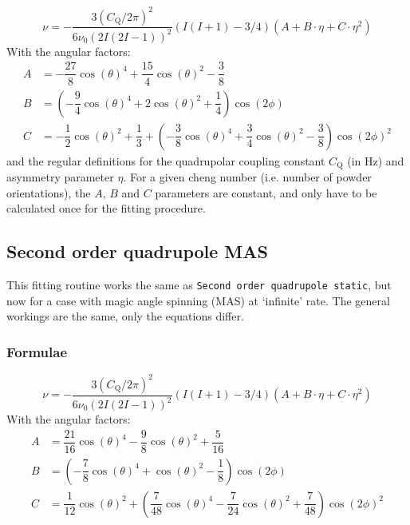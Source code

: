 \documentclass[11pt,a4paper]{article}
\begin{document}
\begin{equation}
\nu = -\dfrac{3{(C_\text{Q}/2\pi)}^2}{6\nu_0(2I(2I-1))^2}(I(I+1)-3/4)(A+B\cdot\eta+C\cdot\eta^2)
\end{equation}
With the angular factors:
\begin{align}
A &= -\dfrac{27}{8}\cos(\theta)^4+\dfrac{15}{4}\cos(\theta)^2-\dfrac{3}{8} \\
B &= \left(-\dfrac{9}{4}\cos(\theta)^4+2\cos(\theta)^2+\dfrac{1}{4}\right)\cos(2\phi) \\
C &=-\dfrac{1}{2}\cos(\theta)^2+\dfrac{1}{3}+\left(-\dfrac{3}{8}\cos(\theta)^4+\dfrac{3}{4}\cos(\theta)^2-\dfrac{3}{8}\right)\cos(2\phi)^2
\end{align}
and the regular definitions for the quadrupolar coupling constant $C_\text{Q}$ (in Hz) and asymmetry parameter $\eta$. For a given cheng number (i.e. number of powder orientations), the $A$, $B$ and $C$ parameters are constant, and only have to be calculated once for the fitting procedure.



\subsection{Second order quadrupole MAS}
This fitting routine works the same as \texttt{Second order quadrupole static}, but now for a case with magic angle spinning (MAS) at `infinite' rate. The general workings are the same, only the equations differ.

\subsubsection*{Formulae}
\begin{equation}
\nu = -\dfrac{3{(C_\text{Q}/2\pi)}^2}{6\nu_0(2I(2I-1))^2}(I(I+1)-3/4)(A+B\cdot\eta+C\cdot\eta^2)
\end{equation}
With the angular factors:
\begin{align}
A &=  \dfrac{21}{16} \cos(\theta)^4 - \dfrac{9}{8} \cos(\theta)^2 + \dfrac{5}{16}\\
B &=  \left(-\dfrac{7}{8} \cos(\theta)^4 + \cos(\theta)^2 - \dfrac{1}{8}\right) \cos(2 \phi)\\
C &=  \dfrac{1}{12} \cos(\theta)^2 + \left( \dfrac{7}{48} \cos(\theta)^4 - \dfrac{7}{24} \cos(\theta)^2 + \dfrac{7}{48} \right) \cos(2 \phi)^2
\end{align}
\end{document}
